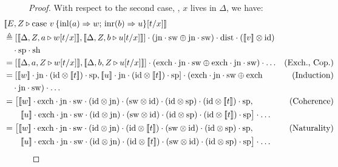 \begin{proof}
  With respect to the second case, \ie, $x$ lives in $\Delta$, we have: 
  \begin{align*}
  &\hspace{-30pt} [\![E, Z \vljud \text{case } v \,  \{\text{inl} (a) \Rightarrow w ;\, \text{inr} (b) \Rightarrow u\} [t/x]]\!] \\
  & \hspace{-30pt} \triangleq \left[[\![ \Delta  , Z ,  a \vljud w[t/x] ]\!] ,[\![ \Delta, Z, b \vljud u[t/x]  ]\!] \right] \comp (\text{jn}\comp \sw \oplus \text{jn} \comp \sw) \comp \dist  \comp ([\![ v ]\!]   \otimes \id)     \\
  &  \hspace{-20pt} \comp \text{sp} \comp \text{sh}  \\
  & \hspace{-30pt} =  \left[[\![ \Delta  ,   a, Z \vljud w[t/x] ]\!] ,[\![ \Delta, b, Z \vljud u[t/x]  ]\!] \right] \comp ( \text{exch} \comp \text{jn}\comp \sw \oplus  \text{exch} \comp \text{jn} \comp \sw)   \comp \ldots   & {(\text{Exch., Cop.})} \\
  & \hspace{-30pt} =   \left[[\![w ]\!] \comp  \text{jn} \comp (\id \otimes [\![t]\!] ) \comp \text{sp}  ,[\![ u]\!] \comp \text{jn} \comp (\id \otimes [\![t]\!] ) \comp \text{sp} \right] \comp (\text{exch} \comp \text{jn} \comp \sw  \oplus \text{exch}  & {\text{(Induction)}}  \\
  & \hspace{-20pt} \comp\text{jn} \comp \sw ) \comp \ldots \\
  & \hspace{-30pt} =  \big[[\![w ]\!] \comp \text{exch} \comp  \text{jn} \comp \sw \comp (\id \otimes \text{jn}) \cdot (\sw \otimes \id) \comp (\id \otimes \text{sp} ) \comp (\id \otimes [\![t]\!] ) \comp \text{sp}  ,  & (\text{Coherence})\\ 
  & \hspace{-10pt}  [\![u ]\!] \comp \text{exch} \comp  \text{jn} \comp \sw \comp (\id \otimes \text{jn}) \cdot (\sw \otimes \id) \comp (\id \otimes \text{sp} ) \comp (\id \otimes [\![t]\!] ) \comp \text{sp} \big]  \cdot \ldots \\
  & \hspace{-30pt} =  \big[[\![w ]\!] \comp \text{exch} \comp  \text{jn} \comp \sw  \comp (\id \otimes \text{jn}) \comp (\id \otimes [\![t]\!] ) \cdot (\sw \otimes \id) \comp (\id \otimes \text{sp} )  \comp \text{sp}  ,  & (\text{Naturality})\\ 
  & \hspace{-10pt}  [\![u ]\!] \comp \text{exch} \comp  \text{jn} \comp \sw \comp (\id \otimes \text{jn}) \comp (\id \otimes [\![t]\!] ) \cdot (\sw \otimes \id) \comp (\id \otimes \text{sp} ) \comp \text{sp} \big]  \cdot \ldots \\

\end{align*}
\end{proof}
